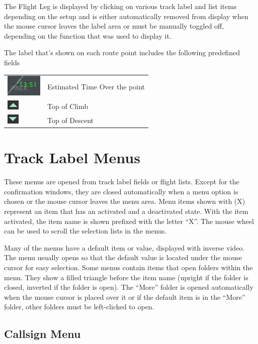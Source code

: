 \documentclass[11pt,a4paper,oldfontcommands]{memoir}
\begin{document}
The Flight Leg is displayed by clicking on various track label and list items depending on the setup and is
either automatically removed from display when the mouse cursor leaves the label area or must be
manually toggled off, depending on the function that was used to display it.

The label that’s shown on each route point includes the following predefined fields
\begin{tabular}{l l}
\includegraphics{img/fleto.png}     & Estimated Time Over the point\\
\includegraphics{img/fltoc.png}   & Top of Climb\\
\includegraphics{img/fltod.png}   & Top of Descent\\
\end{tabular}

\section{Track Label Menus}
These menus are opened from track label fields or flight lists. Except for the confirmation windows, they
are closed automatically when a menu option is chosen or the mouse cursor leaves the menu area. Menu
items shown with (X) represent an item that has an activated and a deactivated state. With the item
activated, the item name is shown prefixed with the letter “X”. The mouse wheel can be used to scroll the
selection lists in the menus.

Many of the menus have a default item or value, displayed with inverse video. The menu usually opens so
that the default value is located under the mouse cursor for easy selection. Some menus contain items that
open folders within the menu. They show a filled triangle before the item name (upright if the folder is
closed, inverted if the folder is open). The “More” folder is opened automatically when the mouse cursor is
placed over it or if the default item is in the “More” folder, other folders must be left-clicked to open.\\

\subsection{Callsign Menu}
\label{menu:cs}
\end{document}
